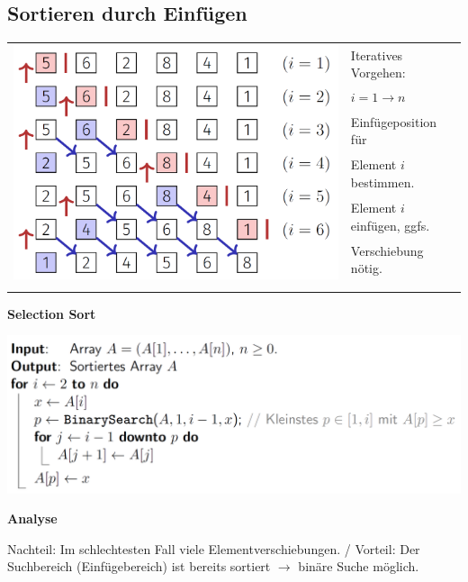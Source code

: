 \vspace{-4pt}
\begin{sectionbox}
\subsection{Sortieren durch Einfügen}\smallskip
\begin{tabular*}{\columnwidth}{@{\extracolsep\fill}ll@{}}
\multirow{7}{*}{\includegraphics[width = 0.55\columnwidth]{../img/InsSort.png}}
& Iteratives Vorgehen: \\
& $i=1\rightarrow n$ \smallskip \\
& Einfügeposition für \\
& Element $i$ bestimmen. \smallskip\\
& Element $i$ einfügen, ggfs.\\
& Verschiebung nötig. \smallskip\\
& \\
& \\
\end{tabular*}\smallskip

\textbf{Selection Sort}\par
\includegraphics[width = \columnwidth]{../img/InsSortCode.png}\par\smallskip

\textbf{Analyse}\par
Nachteil: Im schlechtesten Fall viele Elementverschiebungen. / Vorteil:  Der Suchbereich (Einfügebereich) ist bereits sortiert $\rightarrow$ binäre Suche möglich.

\end{sectionbox}

